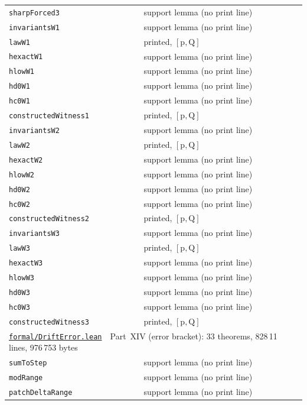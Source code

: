 \documentclass[11pt]{article}
\theoremstyle{plain}
\theoremstyle{definition}
\begin{document}
\begin{longtable}{p{} p{}}
\quad\texttt{sharpForced3} & support lemma (no print line)\\
\quad\texttt{invariantsW1} & support lemma (no print line)\\
\quad\texttt{lawW1} & printed, $[\mathrm{p},\mathrm{Q}]$\\
\quad\texttt{hexactW1} & support lemma (no print line)\\
\quad\texttt{hlowW1} & support lemma (no print line)\\
\quad\texttt{hd0W1} & support lemma (no print line)\\
\quad\texttt{hc0W1} & support lemma (no print line)\\
\quad\texttt{constructedWitness1} & printed, $[\mathrm{p},\mathrm{Q}]$\\
\quad\texttt{invariantsW2} & support lemma (no print line)\\
\quad\texttt{lawW2} & printed, $[\mathrm{p},\mathrm{Q}]$\\
\quad\texttt{hexactW2} & support lemma (no print line)\\
\quad\texttt{hlowW2} & support lemma (no print line)\\
\quad\texttt{hd0W2} & support lemma (no print line)\\
\quad\texttt{hc0W2} & support lemma (no print line)\\
\quad\texttt{constructedWitness2} & printed, $[\mathrm{p},\mathrm{Q}]$\\
\quad\texttt{invariantsW3} & support lemma (no print line)\\
\quad\texttt{lawW3} & printed, $[\mathrm{p},\mathrm{Q}]$\\
\quad\texttt{hexactW3} & support lemma (no print line)\\
\quad\texttt{hlowW3} & support lemma (no print line)\\
\quad\texttt{hd0W3} & support lemma (no print line)\\
\quad\texttt{hc0W3} & support lemma (no print line)\\
\quad\texttt{constructedWitness3} & printed, $[\mathrm{p},\mathrm{Q}]$\\
\hline
\multicolumn{2}{l}{\hyperref[sec:bracket]{\texttt{formal/DriftError.lean}}\ \ Part~XIV (error bracket): 33 theorems, 828\,11 lines, 976\,753 bytes}\\
\quad\texttt{sumToStep} & support lemma (no print line)\\
\quad\texttt{modRange} & support lemma (no print line)\\
\quad\texttt{patchDeltaRange} & support lemma (no print line)\\

\end{longtable}
\end{document}
